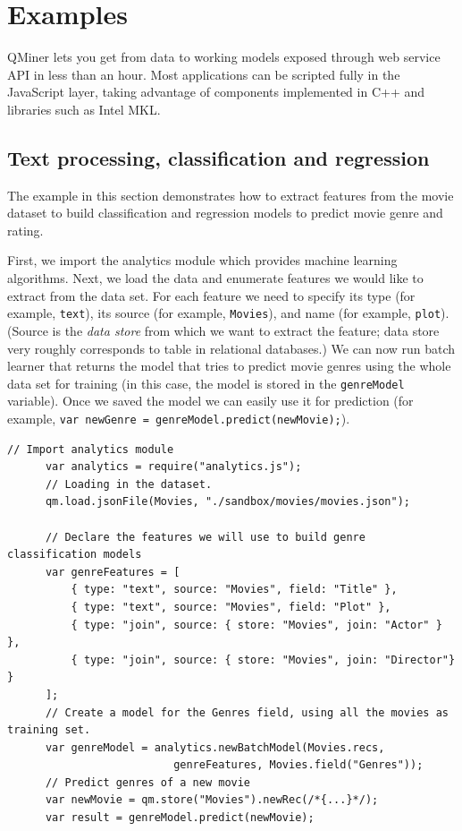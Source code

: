 \documentclass{article} %
\begin{document}
\section{Examples}

QMiner lets you get from data to working models exposed through web service API in less than an hour. Most applications can be scripted fully in the JavaScript layer, taking advantage of components implemented in C++ and libraries such as Intel MKL.

\subsection{Text processing, classification and regression}

The example in this section demonstrates how to extract features from the movie dataset to build classification and regression models to predict movie genre and rating.

First, we import the analytics module which provides machine learning algorithms. Next, we load the data and enumerate features we would like to extract from the data set. For each feature we need to specify its type (for example, \texttt{text}), its source (for example, \texttt{Movies}), and name (for example, \texttt{plot}). (Source is the \emph{data store} from which we want to extract the feature; data store very roughly corresponds to table in relational databases.) We can now run batch learner that returns the model that tries to predict movie genres using the whole data set for training (in this case, the model is stored in the \texttt{genreModel} variable). Once we saved the model we can easily use it for prediction (for example, \texttt{var newGenre = genreModel.predict(newMovie);}).

      \begin{lstlisting}[caption={Text mining: storage, feature extraction, classification and regression}] 	
      // Import analytics module
      var analytics = require("analytics.js");
      // Loading in the dataset.
      qm.load.jsonFile(Movies, "./sandbox/movies/movies.json");
       	
      // Declare the features we will use to build genre classification models
      var genreFeatures = [
          { type: "text", source: "Movies", field: "Title" },
          { type: "text", source: "Movies", field: "Plot" },
          { type: "join", source: { store: "Movies", join: "Actor" } },
          { type: "join", source: { store: "Movies", join: "Director"} }
      ];
      // Create a model for the Genres field, using all the movies as training set.
      var genreModel = analytics.newBatchModel(Movies.recs,
                          genreFeatures, Movies.field("Genres"));
      // Predict genres of a new movie
      var newMovie = qm.store("Movies").newRec(/*{...}*/);
      var result = genreModel.predict(newMovie);
      \end{lstlisting}
\end{document}
